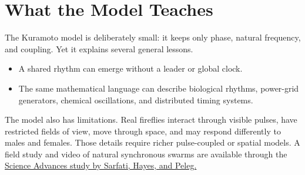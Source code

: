 \section{What the Model Teaches}

The Kuramoto model is deliberately small: it keeps only phase, natural frequency, and coupling. Yet it
explains several general lessons.
\begin{itemize}[label=$\diamond$]
    \item A shared rhythm can emerge without a leader or global clock.
    \item The same mathematical language can describe biological rhythms, power-grid generators, chemical oscillations, and distributed timing systems.
\end{itemize}

The model also has limitations. Real fireflies interact through visible pulses, have restricted fields of
view, move through space, and may respond differently to males and females. Those details require
richer pulse-coupled or spatial models. A field study and video of natural synchronous swarms are
available through the \href{https://doi.org/10.1126/sciadv.abg9259}{Science Advances study by Sarfati, Hayes, and Peleg.}